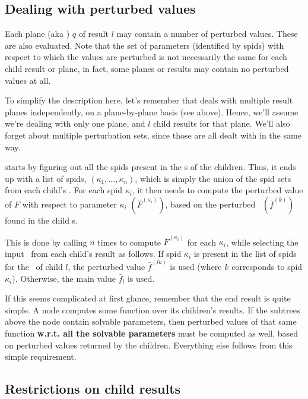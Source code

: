 \subsection{Dealing with perturbed values}

  Each plane (aka \VellSet) $q$ of result $l$ may contain a number of perturbed
  values. These are also evaluated. Note that the set of parameters (identified
  by spids) with respect to which the values are perturbed is not necessarily
  the same for each child result or plane, in fact, some planes or results may
  contain no perturbed values at all.
  
  To simplify the description here, let's remember that  deals
  with multiple result planes independently, on a plane-by-plane basis (see
  above). Hence, we'll assume we're dealing with only one plane, and $l$ child
  results for that plane. We'll also forget about multiple perturbation sets,
  since those are all dealt with in the same way. 

   starts by figuring out all the spids present in the \VellSet{}s
  of the children. Thus, it ends up with a list of spids,
  $(\kappa_1,...,\kappa_n)$, which is simply the union of the spid sets from
  each child's \VellSet. For each spid $\kappa_i$, it then needs to compute the
  perturbed value of $F$ with respect to parameter $\kappa_i$
  $(\bar{F}^{(\kappa_i)})$, based on the perturbed \Vells\
  $(\bar{f}^{(k)})$ found in the child \VellSet{}s.

  This is done by calling  $n$ times to compute
  $\bar{F}^{(\kappa_i)}$ for each $\kappa_i$, while selecting the input \Vells\
  from each child's result as follows. If spid $\kappa_i$ is present in the
  list of spids for  the \VellSet\ of child $l$, the perturbed value
  $\bar{f}^{(lk)}$ is used (where $k$ corresponds to spid $\kappa_i$).
  Otherwise, the main value $\bar{f}_l$ is used.

  If this seems complicated at first glance, remember that the end result is
  quite simple. A  node computes some function over its children's
  results. If the subtrees above the node contain solvable parameters, then
  perturbed values of that same function {\bf w.r.t. all the solvable
  parameters} must be computed as well, based on perturbed values returned by
  the children. Everything else follows from this simple requirement.

\subsection{Restrictions on child results}
   
